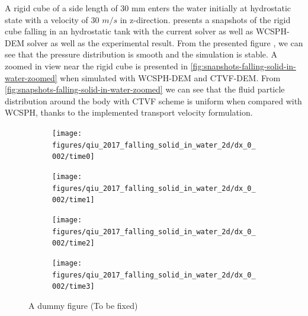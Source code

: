 \documentclass[preprint,12pt]{elsarticle}
\begin{document}
A rigid cube of a side length of 30 mm enters the water initially at
hydrostatic state with a velocity of 30 $m/s$ in z-direction.
 presents a snapshots of the rigid
cube falling in an hydrostatic tank with the current solver as well as
WCSPH-DEM solver as well as the experimental result. From the presented figure
, we can see that the pressure
distribution is smooth and the simulation is stable. A zoomed in view near the
rigid cube is presented in \cref{fig:snapshots-falling-solid-in-water-zoomed}
when simulated with WCSPH-DEM and CTVF-DEM. From
\cref{fig:snapshots-falling-solid-in-water-zoomed} we can see that the fluid
particle distribution around the body with CTVF scheme is uniform when
compared with WCSPH, thanks to the implemented transport velocity formulation.

\begin{figure}[!htpb]
  \centering
  \begin{subfigure}{0.48\textwidth}
    \centering
    \texttt{[image: figures/qiu\_2017\_falling\_solid\_in\_water\_2d/dx\_0\_002/time0]}
  \end{subfigure}
  \begin{subfigure}{0.48\textwidth}
    \centering
    \texttt{[image: figures/qiu\_2017\_falling\_solid\_in\_water\_2d/dx\_0\_002/time1]}
  \end{subfigure}

  \begin{subfigure}{0.48\textwidth}
    \centering
    \texttt{[image: figures/qiu\_2017\_falling\_solid\_in\_water\_2d/dx\_0\_002/time2]}
  \end{subfigure}
  \begin{subfigure}{0.48\textwidth}
    \centering
    \texttt{[image: figures/qiu\_2017\_falling\_solid\_in\_water\_2d/dx\_0\_002/time3]}
  \end{subfigure}
\caption{A dummy figure (To be fixed)}
\label{fig:snapshots-falling-solid-in-water}
\end{figure}
\end{document}
